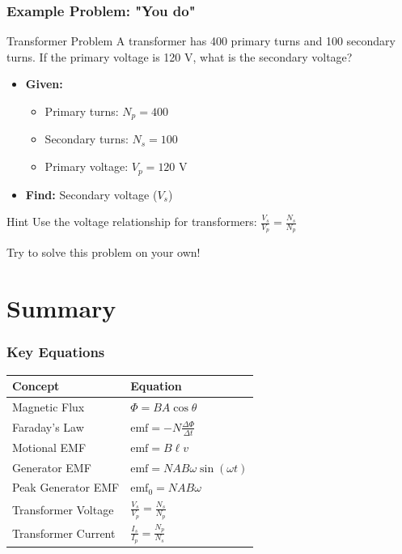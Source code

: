 \documentclass{beamer}
\begin{document}
\begin{frame}
\frametitle{Example Problem: "You do"}
\begin{block}{Transformer Problem}
A transformer has 400 primary turns and 100 secondary turns. If the primary voltage is 120 V, what is the secondary voltage?
\end{block}

\begin{itemize}
\item \textbf{Given:}
\begin{itemize}
    \item Primary turns: $N_p = 400$
    \item Secondary turns: $N_s = 100$
    \item Primary voltage: $V_p = 120 \text{ V}$
\end{itemize}
\item \textbf{Find:} Secondary voltage ($V_s$)
\end{itemize}

\begin{alertblock}{Hint}
Use the voltage relationship for transformers: $\frac{V_s}{V_p} = \frac{N_s}{N_p}$
\end{alertblock}

Try to solve this problem on your own!
\end{frame}

\section{Summary}

\begin{frame}
\frametitle{Key Equations}
\begin{table}
\begin{tabular}{ll}
\hline
\textbf{Concept} & \textbf{Equation} \\
\hline
Magnetic Flux & $\Phi = BA\cos\theta$ \\
Faraday's Law & $\text{emf} = -N\frac{\Delta\Phi}{\Delta t}$ \\
Motional EMF & $\text{emf} = B\ell v$ \\
Generator EMF & $\text{emf} = NAB\omega\sin(\omega t)$ \\
Peak Generator EMF & $\text{emf}_0 = NAB\omega$ \\
Transformer Voltage & $\frac{V_s}{V_p} = \frac{N_s}{N_p}$ \\
Transformer Current & $\frac{I_s}{I_p} = \frac{N_p}{N_s}$ \\
\hline
\end{tabular}
\end{table}
\end{frame}
\end{document}
